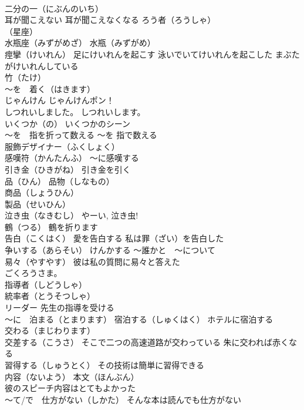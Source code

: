 \documentclass[8pt]{extreport}
\begin{document}
\begin{CJK}{UTF8}{min}
\\	二分の一（にぶんのいち）
\\	耳が聞こえない 耳が聞こえなくなる ろう者（ろうしゃ）
\\	（星座） 
\\	水瓶座（みずがめざ） 水瓶（みずがめ）
\\	痙攣（けいれん） 足にけいれんを起こす 泳いでいてけいれんを起こした まぶたがけいれんしている
\\	竹（たけ）
\\	～を　着く（はきます）
\\	じゃんけん じゃんけんポン！
\\	しつれいしました。 しつれいします。
\\	いくつか（の） いくつかのシーン
\\	～を　指を折って数える ～を 指で数える
\\	服飾デザイナー（ふくしょく）
\\	感嘆符（かんたんふ） ～に感嘆する
\\	引き金（ひきがね） 引き金を引く
\\	品（ひん） 品物（しなもの）
\\	商品（しょうひん） 
\\	製品（せいひん）
\\	泣き虫（なきむし） やーい, 泣き虫!
\\	鶴（つる） 鶴を折ります
\\	告白（こくはく） 愛を告白する 私は罪（ざい）を告白した
\\	争いする（あらそい） けんかする ～誰かと　～について
\\	易々（やすやす） 彼は私の質問に易々と答えた
\\	ごくろうさま。
\\	指導者（しどうしゃ）
\\	統率者（とうそつしゃ）
\\	リーダー 先生の指導を受ける
\\	～に　泊まる（とまります） 宿泊する（しゅくはく） ホテルに宿泊する
\\	交わる（まじわります） 
\\	交差する（こうさ） そこで二つの高速道路が交わっている 朱に交われば赤くなる
\\	習得する（しゅうとく） その技術は簡単に習得できる
\\	内容（ないよう） 本文（ほんぶん）
\\	彼のスピーチ内容はとてもよかった
\\	～て/で　仕方がない（しかた） そんな本は読んでも仕方がない

\end{CJK}
\end{document}
